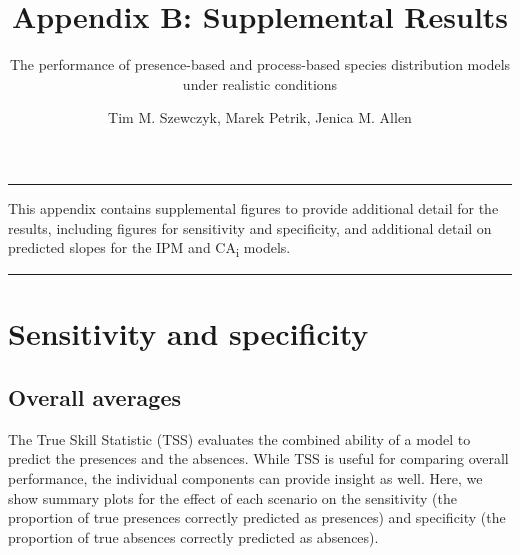 \documentclass[]{article}
\title{Appendix B: Supplemental Results}
\subtitle{The performance of presence-based and process-based species distribution
models under realistic conditions}
\author{Tim M. Szewczyk, Marek Petrik, Jenica M. Allen}
\date{}
\begin{document}
\maketitle

{
\setcounter{tocdepth}{1}
\tableofcontents
}
\setcounter{table}{0}  \renewcommand{\thetable}{B.\arabic{table}} \setcounter{figure}{0} \renewcommand{\thefigure}{B.\arabic{figure}}

\begin{center}\rule{0.5\linewidth}{\linethickness}\end{center}

This appendix contains supplemental figures to provide additional detail
for the results, including figures for sensitivity and specificity, and
additional detail on predicted slopes for the IPM and
CA\textsubscript{i} models.

\begin{center}\rule{0.5\linewidth}{\linethickness}\end{center}

\section{Sensitivity and specificity}

\subsection{Overall averages}

The True Skill Statistic (TSS) evaluates the combined ability of a model
to predict the presences and the absences. While TSS is useful for
comparing overall performance, the individual components can provide
insight as well. Here, we show summary plots for the effect of each
scenario on the sensitivity (the proportion of true presences correctly
predicted as presences) and specificity (the proportion of true absences
correctly predicted as absences). \clearpage
\end{document}
